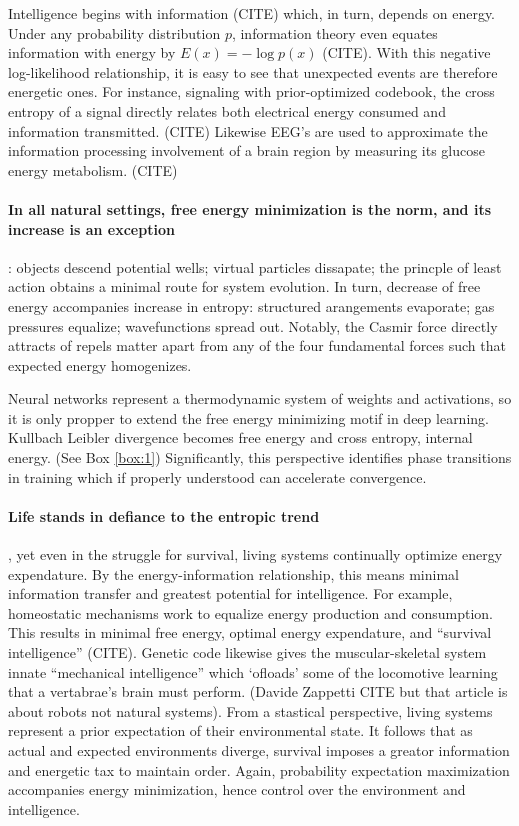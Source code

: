 Intelligence begins with information (CITE) which, in turn, depends on energy. Under any probability distribution $p$, information theory even equates information with energy by $E(x) = - \log{p(x)} $ (CITE). With this negative log-likelihood relationship, it is easy to see that unexpected events are therefore energetic ones. For instance, signaling with prior-optimized codebook, the cross entropy of a signal directly relates both electrical energy consumed and information transmitted. (CITE) Likewise EEG's are used to approximate the information processing involvement of a brain region by measuring its glucose energy metabolism. (CITE)

\paragraph{In all natural settings, free energy minimization is the norm, and its increase is an exception}: objects descend potential wells; virtual particles dissapate; the princple of least action obtains a minimal route for system evolution. In turn, decrease of free energy accompanies increase in entropy: structured arangements evaporate; gas pressures equalize; wavefunctions spread out. Notably, the Casmir force directly attracts of repels matter apart from any of the four fundamental forces such that expected energy homogenizes. 

Neural networks represent a thermodynamic system of weights and activations, so it is only propper to extend the free energy minimizing motif in deep learning. Kullbach Leibler divergence becomes free energy and cross entropy, internal energy. (See Box \ref{box:1}) Significantly, this perspective identifies phase transitions in training which if properly understood can accelerate convergence.

\paragraph{Life stands in defiance to the entropic trend}, yet even in the struggle for survival, living systems continually optimize energy expendature. By the energy-information relationship, this means minimal information transfer and greatest potential for intelligence. For example, homeostatic mechanisms work to equalize energy production and consumption. This results in minimal free energy, optimal energy expendature, and ``survival intelligence'' (CITE). Genetic code likewise gives the muscular-skeletal system innate ``mechanical intelligence'' which `ofloads' some of the locomotive learning that a vertabrae's brain must perform. (Davide Zappetti CITE but that article is about robots not natural systems). From a stastical perspective, living systems represent a prior expectation of their environmental state. It follows that as actual and expected environments diverge, survival imposes a greator information and energetic tax to maintain order. Again, probability expectation maximization accompanies energy minimization, hence control over the environment and intelligence.

